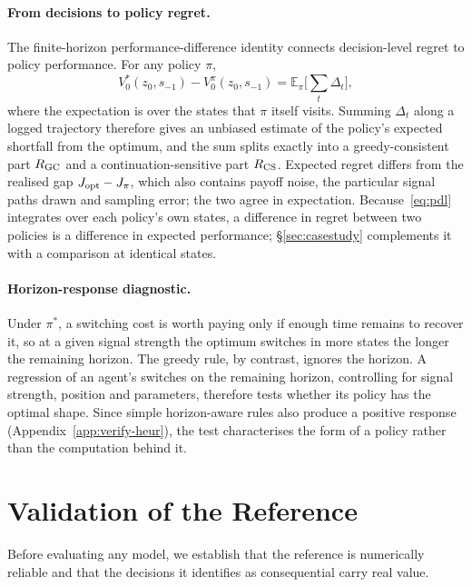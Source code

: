 \documentclass[10pt,a4paper,twocolumn]{article}
\newcommand{\J}{J}
\begin{document}
\paragraph{From decisions to policy regret.}\label{sec:regret} The finite-horizon performance-difference identity connects decision-level regret to policy performance. For any policy $\pi$,
\begin{equation}
V^*_0(z_0,s_{-1})-V^{\pi}_0(z_0,s_{-1})=\mathbb E_{\pi}\Big[\textstyle\sum_{t}\Delta_t\Big],
\label{eq:pdl}
\end{equation}
where the expectation is over the states that $\pi$ itself visits. Summing $\Delta_t$ along a logged trajectory therefore gives an unbiased estimate of the policy's expected shortfall from the optimum, and the sum splits exactly into a greedy-consistent part $R_{\rm GC}$ and a continuation-sensitive part $R_{\rm CS}$. Expected regret differs from the realised gap $\J_{\rm opt}-\J_\pi$, which also contains payoff noise, the particular signal paths drawn and sampling error; the two agree in expectation. Because~\eqref{eq:pdl} integrates over each policy's own states, a difference in regret between two policies is a difference in expected performance; \S\ref{sec:casestudy} complements it with a comparison at identical states.

\paragraph{Horizon-response diagnostic.} Under $\pi^*$, a switching cost is worth paying only if enough time remains to recover it, so at a given signal strength the optimum switches in more states the longer the remaining horizon. The greedy rule, by contrast, ignores the horizon. A regression of an agent's switches on the remaining horizon, controlling for signal strength, position and parameters, therefore tests whether its policy has the optimal shape. Since simple horizon-aware rules also produce a positive response (Appendix~\ref{app:verify-heur}), the test characterises the form of a policy rather than the computation behind it.

\section{Validation of the Reference}\label{sec:validation}

Before evaluating any model, we establish that the reference is numerically reliable and that the decisions it identifies as consequential carry real value.
\end{document}
